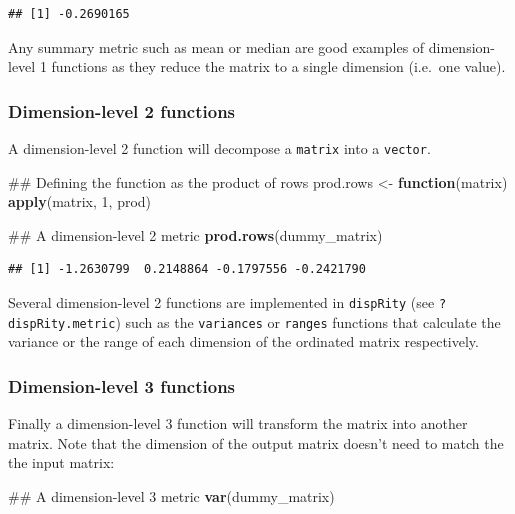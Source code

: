 \documentclass[]{book}
\newenvironment{Shaded}{\begin{snugshade}}{\end{snugshade}}
\newcommand{\KeywordTok}[1]{\textcolor[rgb]{0.13,0.29,0.53}{\textbf{#1}}}
\newcommand{\DecValTok}[1]{\textcolor[rgb]{0.00,0.00,0.81}{#1}}
\newcommand{\StringTok}[1]{\textcolor[rgb]{0.31,0.60,0.02}{#1}}
\newcommand{\ControlFlowTok}[1]{\textcolor[rgb]{0.13,0.29,0.53}{\textbf{#1}}}
\newcommand{\NormalTok}[1]{#1}
\theoremstyle{definition}
\theoremstyle{definition}
\theoremstyle{remark}
\begin{document}
\begin{verbatim}
## [1] -0.2690165
\end{verbatim}

Any summary metric such as mean or median are good examples of
dimension-level 1 functions as they reduce the matrix to a single
dimension (i.e.~one value).

\subsubsection{Dimension-level 2
functions}\label{dimension-level-2-functions}

A dimension-level 2 function will decompose a \texttt{matrix} into a
\texttt{vector}.

\begin{Shaded}
\begin{Highlighting}[]
\NormalTok{## Defining the function as the product of rows}
\NormalTok{prod.rows <-}\StringTok{ }\ControlFlowTok{function}\NormalTok{(matrix) }\KeywordTok{apply}\NormalTok{(matrix, }\DecValTok{1}\NormalTok{, prod)}

\NormalTok{## A dimension-level 2 metric}
\KeywordTok{prod.rows}\NormalTok{(dummy_matrix)}
\end{Highlighting}
\end{Shaded}

\begin{verbatim}
## [1] -1.2630799  0.2148864 -0.1797556 -0.2421790
\end{verbatim}

Several dimension-level 2 functions are implemented in \texttt{dispRity}
(see \texttt{?dispRity.metric}) such as the \texttt{variances} or
\texttt{ranges} functions that calculate the variance or the range of
each dimension of the ordinated matrix respectively.

\subsubsection{Dimension-level 3
functions}\label{dimension-level-3-functions}

Finally a dimension-level 3 function will transform the matrix into
another matrix. Note that the dimension of the output matrix doesn't
need to match the the input matrix:

\begin{Shaded}
\begin{Highlighting}[]
\NormalTok{## A dimension-level 3 metric}
\KeywordTok{var}\NormalTok{(dummy_matrix)}
\end{Highlighting}
\end{Shaded}
\end{document}
